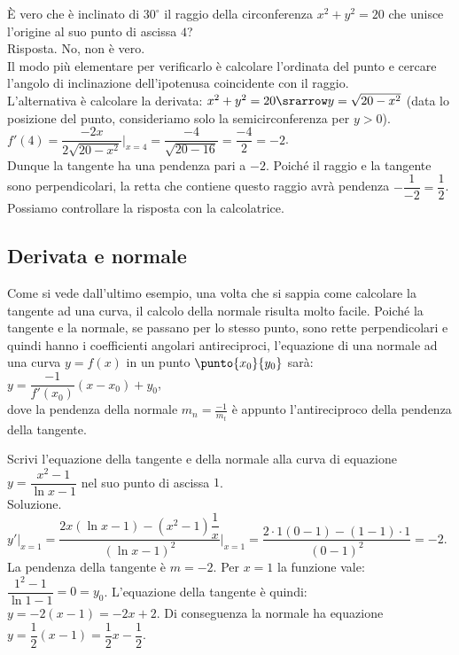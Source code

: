 \begin{esempio}
  È vero che è inclinato di $30^\circ$ il raggio  
  della circonferenza $x^2+y^2=20$ che unisce l'origine al suo punto di 
ascissa
  $4$?\\
  Risposta. No, non è vero. \\
  Il modo più elementare per verificarlo è calcolare l'ordinata
  del punto e cercare l'angolo di inclinazione dell'ipotenusa coincidente 
con 
  il raggio.\\
  L'alternativa è calcolare la derivata:
  $x^2+y^2=20\srarrow y=\sqrt{20-x^2}$ (data lo posizione del punto,
  consideriamo solo la semicirconferenza per $y>0$).\\
  $f'(4)= \dfrac{-2x}{2\sqrt{20-x^2}}\bigg|_{x=4}=\dfrac{-4}{\sqrt{20-16}}=
  \dfrac{-4}{2}=-2$.\\
  Dunque la tangente ha una pendenza pari a $-2$. Poiché il raggio e la 
  tangente sono perpendicolari, la retta che contiene questo raggio avrà 
  pendenza $-\dfrac{1}{-2}=\dfrac{1}{2}$.\\
  Possiamo controllare la risposta con la calcolatrice.
  \end{esempio}
 
\subsection{Derivata e normale}
\label{}
Come si vede dall'ultimo esempio, una volta che si sappia come calcolare 
la tangente ad una curva, il calcolo della normale risulta molto facile.
Poiché la tangente e la normale, se passano per lo stesso punto, sono rette
perpendicolari e quindi hanno i coefficienti angolari antireciproci,
l'equazione di una normale ad una curva $y=f(x)$ in un punto 
$\punto{x_0}{y_0}$
sarà:\\
$y=\dfrac{-1}{f'(x_0)}(x-x_0)+y_0$,\\
dove la pendenza della normale $m_n=\frac{-1}{m_t}$ è appunto 
l'antireciproco della pendenza della tangente.

\begin{esempio}
Scrivi l'equazione della tangente e della normale alla curva di equazione
$y=\dfrac{x^2-1}{\ln x -1}$ nel suo punto di ascissa $1$.\\
Soluzione. $y'|_{x=1}=\dfrac{2x(\ln x-1)-(x^2-1)\dfrac{1}{x}}
{(\ln x -1)^2}\bigg|_{x=1}=\dfrac{2\cdot 1(0-1)-(1-1)\cdot 
1}{(0-1)^2}=-2$.\\
La pendenza della tangente è $m=-2$. Per $x=1$ la funzione vale:
$\dfrac{1^2-1}{\ln 1 -1}=0=y_0$. L'equazione della tangente è quindi:
$y=-2(x-1)=-2x+2$. Di conseguenza la normale ha equazione 
$y=\dfrac{1}{2}(x-1)=\dfrac{1}{2}x-\dfrac{1}{2}$.
\end{esempio}


